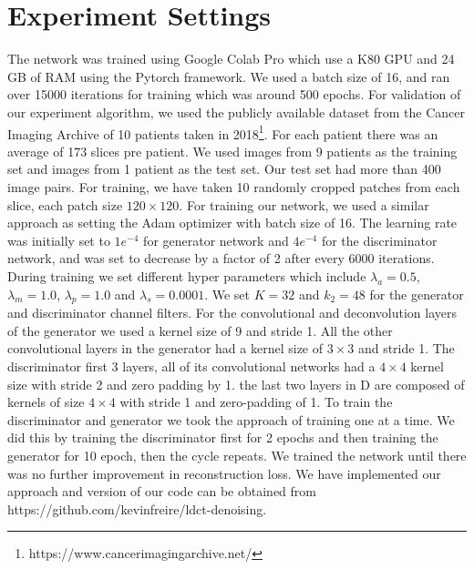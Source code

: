 \documentclass[journal]{IEEEtran}
\begin{document}
\section{Experiment Settings}
\label{experiment settings}
	The network was trained using Google Colab Pro which use a K80 GPU and 24 GB of RAM using the Pytorch framework. We used a batch size of 16,  and ran over 15000 iterations for training which was around 500 epochs.  For validation of our experiment algorithm, we used the publicly available dataset from the Cancer Imaging Archive of 10 patients taken in 2018\footnote{https://www.cancerimagingarchive.net/}.  For each patient there was an average of 173 slices pre patient.  We used images from 9 patients as the training set and images from 1 patient as the test set.  Our test set had more than 400 image pairs.  For training, we have taken 10 randomly cropped patches from each slice, each patch size $120 \times 120$.  For training our network, we used a similar approach as \cite{9474492} setting the Adam optimizer with batch size of 16.  The learning rate was initially set to $1e^{-4}$ for generator network and $4e^{-4}$ for the discriminator network, and was set to decrease by a factor of 2 after every 6000 iterations.  During training we set different hyper parameters which include $\lambda_a=0.5$, $\lambda_m=1.0$, $\lambda_p=1.0$ and $\lambda_s=0.0001$. We set $K=32$ and $k_2=48$ for the generator and discriminator channel filters.  For the convolutional and deconvolution layers of the generator we used a kernel size of 9 and stride 1.  All the other convolutional layers in the generator had a kernel size of $3 \times 3$ and stride 1.   The discriminator first 3 layers, all of its convolutional networks had a $4 \times 4$ kernel size with stride 2 and zero padding by 1.  the last two layers in D are composed of kernels of size $4\times 4$ with stride 1 and zero-padding of 1. To train the discriminator and generator we took the approach of training one at a time.  We did this by training the discriminator first for 2 epochs and then training the generator for 10 epoch, then the cycle repeats.  We trained the network until there was no further improvement in reconstruction loss.  We have implemented our approach and version of our code can be obtained from https://github.com/kevinfreire/ldct-denoising.
	
\end{document}
